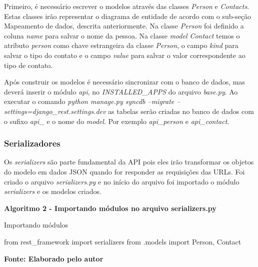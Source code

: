   Primeiro, é necessário escrever o modelos através das classes \textit{Person} e \textit{Contacts}. Estas classes irão representar o diagrama
  de entidade de acordo com o sub-seção Mapeamento de dados, descrita anteriormente.
  Na classe \textit{Person} foi definido a coluna \textit{name} para salvar o nome da pessoa.  
  Na classe \textit{model} \textit{Contact} temos o atributo \textit{person} como chave estrangeira da classe \textit{Person}, 
  o campo \textit{kind} para salvar o tipo do contato e o campo \textit{value} para salvar o valor correspondente ao tipo de contato.
  
  Após construir os modelos é necessário sincronizar com o banco de dados, mas deverá inserir o módulo \textit{api}, no 
  \textit{INSTALLED\_APPS} do arquivo \textit{base.py}. Ao executar o comando \textit{python manage.py syncdb --migrate --settings=django\_rest.settings.dev}
  as tabelas serão criadas no banco de dados com o sufixo \textit{api\_} e o nome do \textit{model}. Por exemplo \textit{api\_person} e \textit{api\_contact}.
  
\subsubsection{Serializadores}

  Os \textit{serializers} são parte fundamental da API pois eles irão transformar os objetos do modelo em dados \ac{JSON} quando for 
  responder as requisições das URLs.
  Foi criado o arquivo \textit{serializers.py} e no início do arquivo foi importado o módulo \textit{serializers} e os modelos
  criados.
  
  \begin{center}	
    \textbf{Algoritmo 2 -  Importando módulos no arquivo serializers.py}
    \vspace{-0.3cm}
    \begin{minipage}[ht]{13cm}
      \begin{algorithm}[H]
      \footnotesize
      \caption{Importando módulos}
      \label{alg:imports_serializers}
	\begin{algorithmic}[1]
	  \STATE from rest\_framework import serializers 
	  \STATE from .models import Person, Contact
	\end{algorithmic}
      \end{algorithm}

      \small \centering \textbf{\footnotesize Fonte: Elaborado pelo autor}
    \end{minipage}
  \end{center}
  
